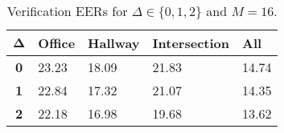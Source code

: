 \begin{table}[h]
    \centering
    \begin{tabular}{|c|M{2cm}|M{2cm}|M{2cm}|M{2cm}|}
    \hline
    $\boldsymbol{\Delta}$ & \bf{Office} & \bf{Hallway} & \bf{Intersection} & \bf{All} \\ 
    \hline 
    \hline
    \bf{0} & 23.23 & 18.09 & 21.83 & 14.74 \\
    \hline
    \bf{1} & 22.84 & 17.32 & 21.07 & 14.35 \\
    \hline
    \bf{2} & 22.18 & 16.98 & 19.68 & 13.62 \\
    \hline
    \end{tabular}
    \caption{Verification EERs for $\Delta \in \{0, 1, 2\}$ and $M = 16$.}
    \label{tab:verify_adapted_wm_M_16}
\end{table}
